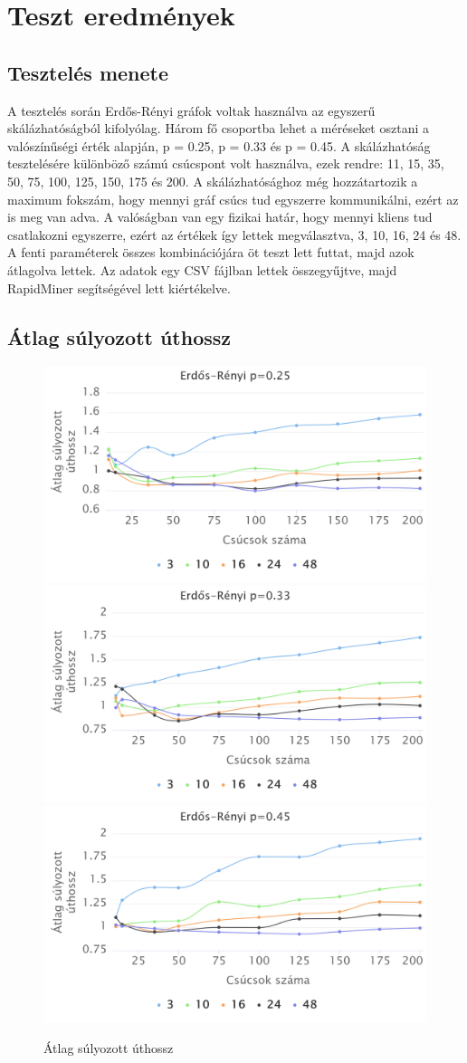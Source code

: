 \documentclass[12pt]{report}
\begin{document}
\chapter{Teszt eredmények}

\section{Tesztelés menete}

A tesztelés során Erdős-Rényi gráfok voltak használva az egyszerű skálázhatóságból kifolyólag.
Három fő csoportba lehet a méréseket osztani a valószínűségi érték alapján, p = 0.25, p = 0.33 és p = 0.45.
A skálázhatóság tesztelésére különböző számú csúcspont volt használva, ezek rendre: 11, 15, 35, 50, 75, 100, 125, 150, 175 és 200.
A skálázhatósághoz még hozzátartozik a maximum fokszám, hogy mennyi gráf csúcs tud egyszerre kommunikálni, ezért az is meg van adva.
A valóságban van egy fizikai határ, hogy mennyi kliens tud csatlakozni egyszerre, ezért az értékek így lettek megválasztva, 3, 10, 16, 24 és 48.
A fenti paraméterek összes kombinációjára öt teszt lett futtat, majd azok átlagolva lettek.
Az adatok egy CSV fájlban lettek összegyűjtve, majd RapidMiner\cite{noauthor_lightning_nodate} segítségével lett kiértékelve.

\section{Átlag súlyozott úthossz}

\begin{figure}[h]
	\begin{center}
		\includegraphics[width=0.40\linewidth]{pictures/constant_dan_ratio25_avg_route_len.png}
		\includegraphics[width=0.40\linewidth]{pictures/constant_dan_ratio33_avg_route_len.png}
		\includegraphics[width=0.40\linewidth]{pictures/constant_dan_ratio45_avg_route_len.png}
		\caption{Átlag súlyozott úthossz}
		\label{avg-len}
	\end{center}
\end{figure}
\end{document}
